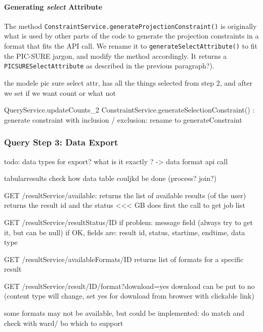 \paragraph{Generating \emph{select} Attribute}
The method \verb|ConstraintService.generateProjectionConstraint()| is originally what is used by other parts of the code to generate the projection constraints in a format that fits the API call.
We rename it to \verb|generateSelectAttribute()| to fit the PIC-SURE jargon, and modify the method accordingly.
It returns a \verb|PICSURESelectAttribute| as described in the previous paragraph?).


the modele pic sure select attr, has all the things selected from step 2, and after we set if we want count or what not 



QueryService.updateCounts_2
ConstraintService.generateSelectionConstraint() : generate constraint with inclusion / exclusion: rename to generateConstraint



\subsubsection{Query Step 3:  Data Export}

todo: data types for export? what is it exactly ? -> data format api call 


tabularresults
check how data table couljkd be done (process? join?)



GET /resultService/available: returns the list of available results (of the user)
returns the result id and the status
<<< GB does first the call to get job list

GET /resultService/resultStatus/ID
if problem: message field (always try to get it, but can be null)
if OK, fields are: result id, status, startime, endtime, data type

GET /resultService/availableFormats/ID
returns list of formats for a specific result

GET /resultService/result/ID/format?download=yes
download can be put to no (content type will change, set yes for download from browser with clickable link)


some formats may not be available, but could be implemented: do match and check with ward/ bo which to support

